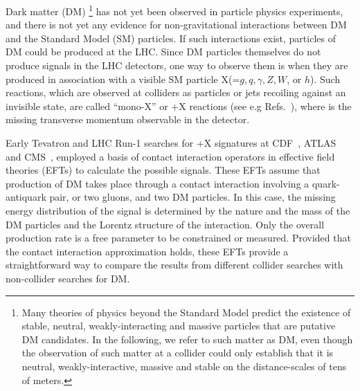 Dark matter (DM) \footnote{Many theories of physics beyond the Standard Model predict the existence
of stable, neutral, weakly-interacting and massive particles that are
putative DM candidates. In the following, we refer to such
matter as DM, even though the observation of such matter at a collider
could only establish that it is neutral, weakly-interactive, massive and stable
on the distance-scales of tens of meters.} has not yet been observed in particle physics experiments, and
there is not yet any evidence for non-gravitational interactions
between DM and the Standard Model (SM) particles.  If such
interactions exist, particles of DM could be produced
at the LHC. Since DM particles themselves do not produce signals
in the LHC detectors, one way to observe them is when they are produced in association
with a visible SM particle X(=$g, q, \gamma, Z, W$, or $h$).
Such reactions, which are
observed at colliders as particles or jets recoiling against an invisible state, are
called ``mono-X'' or \MET{}+X reactions (see e.g 
Refs.~\cite{Birkedal:2004xn,Feng:2005gj,Petriello:2008pu,Beltran:2010ww,Bai:2010hh}), 
where \MET is the missing transverse momentum observable in the detector.

Early Tevatron and LHC Run-1 searches for \MET{}+X signatures at 
CDF~\cite{Aaltonen:2012jb}, 
ATLAS~\cite{Aad:2015zva,Aad:2014tda,ATLAS:2014wra,Aad:2014vka,Aad:2013oja,Aad:2014wza,Aad:2014vea,ATL-PHYS-PUB-2014-007}
and
CMS~\cite{Khachatryan:2014rra,Khachatryan:2014rwa,Khachatryan:2014tva,Khachatryan:2014uma,Khachatryan:2015nua,CMS-PAS-B2G-13-004,CMS-PAS-EXO-14-004},
employed a basis of contact interaction operators in effective field
theories (EFTs) \cite{Goodman:2010yf,Goodman:2010ku} to calculate the
possible signals. %
These EFTs assume that production of DM takes place through a
contact interaction involving a quark-antiquark pair, or two gluons,
and two DM particles.  In this case, the missing energy
distribution of the signal is determined by the nature and the mass of
the DM particles and the Lorentz structure of the
interaction. Only the overall production rate is a free parameter to
be constrained or measured.  Provided that the contact interaction
approximation holds, these EFTs provide a straightforward way to
compare the results from different collider searches with non-collider
searches for DM.  

